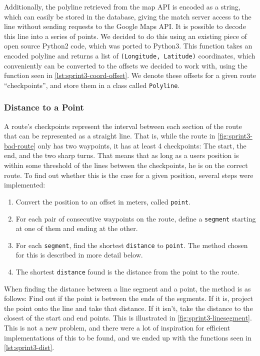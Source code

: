 Additionally, the polyline retrieved from the map API is encoded as a string, which can easily be stored in the database, giving the match server access to the line without sending requests to the Google Maps \ac{API}. It is possible to decode this line into a series of points. We decided to do this using an existing piece of open source Python2 code\cite{decodepolyline}, which was ported to Python3. This function takes an encoded polyline and returns a list of \texttt{(Longitude, Latitude)} coordinates, which conveniently can be converted to the offsets we decided to work with, using the function seen in \autoref{lst:sprint3-coord-offset}. We denote these offsets for a given route ``checkpoints'', and store them in a class called \texttt{Polyline}.

\subsubsection{Distance to a Point}

A route's checkpoints represent the interval between each section of the route that can be represented as a straight line. That is, while the route in \autoref{fig:sprint3-bad-route} only has two waypoints, it has at least 4 checkpoints: The start, the end, and the two sharp turns. That means that as long as a users position is within some threshold of the lines between the checkpoints, he is on the correct route. To find out whether this is the case for a given position, several steps were implemented:

\begin{enumerate}
 \item Convert the position to an offset in meters, called \texttt{point}.
 \item For each pair of consecutive waypoints on the route, define a \texttt{segment} starting at one of them and ending at the other.
 \item For each \texttt{segment}, find the shortest \texttt{distance} to \texttt{point}. The method chosen for this is described in more detail below.
 \item The shortest \texttt{distance} found is the distance from the point to the route.
\end{enumerate}

When finding the distance between a line segment and a point, the method is as follows: Find out if the point is between the ends of the segments. If it is, project the point onto the line and take that distance. If it isn't, take the distance to the closest of the start and end points. This is illustrated in \autoref{fig:sprint3-linesegment}. This is not a new problem, and there were a lot of inspiration for efficient implementations of this to be found\cite{point2line1}\cite{point2line2}, and we ended up with the functions seen in \autoref{lst:sprint3-dist}.

